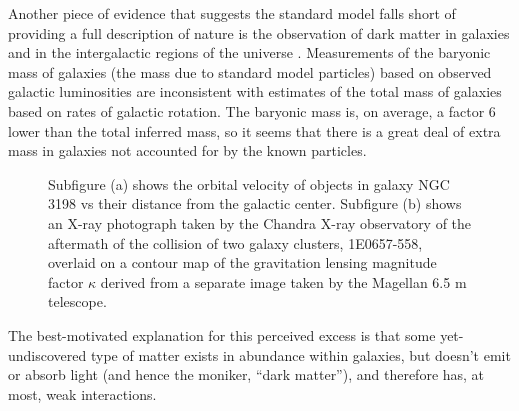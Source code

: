 Another piece of evidence that suggests the standard model falls short of providing a full description of nature is the observation of dark matter in galaxies and in the intergalactic regions of the universe \cite{Davis:1985rj}\cite{Komatsu:2008hk}. Measurements of the baryonic mass of galaxies (the mass due to standard model particles) based on observed galactic luminosities are inconsistent with estimates of the total mass of galaxies based on rates of galactic rotation. The baryonic mass is, on average, a factor 6 lower than the total inferred mass, so it seems that there is a great deal of extra mass in galaxies not accounted for by the known particles.  
\begin{figure}[h]
\caption{Subfigure (a) \cite{vanAlbada:1984js} shows the orbital velocity of objects in galaxy NGC 3198 vs their distance from the galactic center. Subfigure (b) \cite{Clowe:2006xq} shows an X-ray photograph taken by the Chandra X-ray observatory of the aftermath of the collision of two galaxy clusters, 1E0657-558, overlaid on a contour map of the gravitation lensing magnitude factor $\kappa$ derived from a separate image taken by the Magellan 6.5 m telescope. } 
\label{fig:DM}
\end{figure}
The best-motivated explanation for this perceived excess is that some yet-undiscovered type of matter exists in abundance within galaxies, but doesn't emit or absorb light (and hence the moniker, ``dark matter''), and therefore has, at most, weak interactions. 

